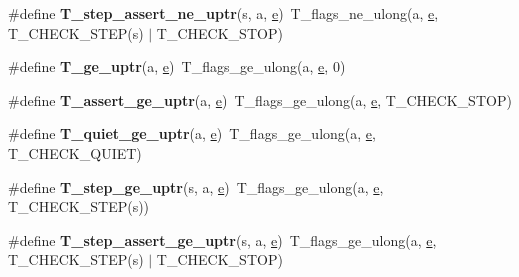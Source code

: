 \begin{DoxyCompactItemize}
\#define {\bfseries T\+\_\+step\+\_\+assert\+\_\+ne\+\_\+uptr}(s,  a,  \mbox{\hyperlink{sun4u_2tte_8h_a8b0b9ed08e0e18920ec2682f48228c27}{e}})~T\+\_\+flags\+\_\+ne\+\_\+ulong(a, \mbox{\hyperlink{sun4u_2tte_8h_a8b0b9ed08e0e18920ec2682f48228c27}{e}}, T\+\_\+\+C\+H\+E\+C\+K\+\_\+\+S\+T\+EP(s) $\vert$ T\+\_\+\+C\+H\+E\+C\+K\+\_\+\+S\+T\+OP)
\item 
\mbox{\label{group__RTEMSTestFrameworkChecksUIntptr_gad201568a15a6f8e99521d22175143b41}} 
\#define {\bfseries T\+\_\+ge\+\_\+uptr}(a,  \mbox{\hyperlink{sun4u_2tte_8h_a8b0b9ed08e0e18920ec2682f48228c27}{e}})~T\+\_\+flags\+\_\+ge\+\_\+ulong(a, \mbox{\hyperlink{sun4u_2tte_8h_a8b0b9ed08e0e18920ec2682f48228c27}{e}}, 0)
\item 
\mbox{\label{group__RTEMSTestFrameworkChecksUIntptr_ga71617c6e6e236318e381564a8ee49ff6}} 
\#define {\bfseries T\+\_\+assert\+\_\+ge\+\_\+uptr}(a,  \mbox{\hyperlink{sun4u_2tte_8h_a8b0b9ed08e0e18920ec2682f48228c27}{e}})~T\+\_\+flags\+\_\+ge\+\_\+ulong(a, \mbox{\hyperlink{sun4u_2tte_8h_a8b0b9ed08e0e18920ec2682f48228c27}{e}}, T\+\_\+\+C\+H\+E\+C\+K\+\_\+\+S\+T\+OP)
\item 
\mbox{\label{group__RTEMSTestFrameworkChecksUIntptr_gaafca1799ec16fa3a24209ddd5a142823}} 
\#define {\bfseries T\+\_\+quiet\+\_\+ge\+\_\+uptr}(a,  \mbox{\hyperlink{sun4u_2tte_8h_a8b0b9ed08e0e18920ec2682f48228c27}{e}})~T\+\_\+flags\+\_\+ge\+\_\+ulong(a, \mbox{\hyperlink{sun4u_2tte_8h_a8b0b9ed08e0e18920ec2682f48228c27}{e}}, T\+\_\+\+C\+H\+E\+C\+K\+\_\+\+Q\+U\+I\+ET)
\item 
\mbox{\label{group__RTEMSTestFrameworkChecksUIntptr_ga61b89451656eb2fae54b2b4dee779001}} 
\#define {\bfseries T\+\_\+step\+\_\+ge\+\_\+uptr}(s,  a,  \mbox{\hyperlink{sun4u_2tte_8h_a8b0b9ed08e0e18920ec2682f48228c27}{e}})~T\+\_\+flags\+\_\+ge\+\_\+ulong(a, \mbox{\hyperlink{sun4u_2tte_8h_a8b0b9ed08e0e18920ec2682f48228c27}{e}}, T\+\_\+\+C\+H\+E\+C\+K\+\_\+\+S\+T\+EP(s))
\item 
\mbox{\label{group__RTEMSTestFrameworkChecksUIntptr_ga02f3df9434e8fbabf3d18f93983ce8ea}} 
\#define {\bfseries T\+\_\+step\+\_\+assert\+\_\+ge\+\_\+uptr}(s,  a,  \mbox{\hyperlink{sun4u_2tte_8h_a8b0b9ed08e0e18920ec2682f48228c27}{e}})~T\+\_\+flags\+\_\+ge\+\_\+ulong(a, \mbox{\hyperlink{sun4u_2tte_8h_a8b0b9ed08e0e18920ec2682f48228c27}{e}}, T\+\_\+\+C\+H\+E\+C\+K\+\_\+\+S\+T\+EP(s) $\vert$ T\+\_\+\+C\+H\+E\+C\+K\+\_\+\+S\+T\+OP)

\end{DoxyCompactItemize}
